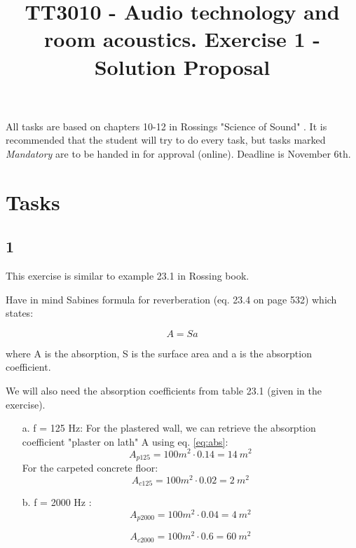 \documentclass{article}
\title{TT3010 - Audio technology and room acoustics. \newline Exercise 1 - Solution Proposal}
\author{}
\date{}
\begin{document}
\maketitle


All tasks are based on chapters 10-12 in Rossings "Science of Sound" \cite{rossing}. 
It is recommended that the student will try to do every task, but tasks marked \textit{Mandatory} are to be handed in for approval (online). Deadline is November 6th.

\section*{Tasks}

\subsection*{1}

This exercise is similar to example 23.1 in Rossing book. 


Have in mind Sabines formula for reverberation (eq. 23.4 on page 532) which states:

\begin{equation}
    A = Sa
    \label{eq:abs}
\end{equation}

where A is the absorption, S is the surface area and a is the absorption coefficient.

We will also need the absorption coefficients from table 23.1 (given in the exercise).

\begin{itemize}
    \item [a.] f = 125 Hz:
    For the plastered wall, we can retrieve the absorption coefficient "plaster on lath" A using eq. \ref{eq:abs}:
    \begin{equation}
        A_{p125}=100 m^2 \cdot 0.14 = 14\ m^2
    \end{equation}
    For the carpeted concrete floor:
    \begin{equation}
        A_{c125} =100m^2 \cdot 0.02 = 2 \ m^2
    \end{equation}
    
    
    \item [b.] f = 2000 Hz : 
    \begin{equation}
        A_{p2000} = 100 m^2 \cdot 0.04 = 4\ m^2
    \end{equation}
    
    \begin{equation}
        A_{c2000}= 100 m^2 \cdot 0.6 = 60\ m^2
    \end{equation}
\end{itemize}
\end{document}
